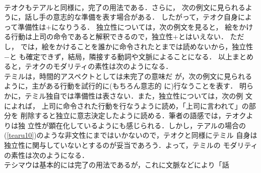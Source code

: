 \\テオクもテアルと同様に，完了の用法である．さらに，
次の例文に見られるように，話し手の意志的な準備を表す場合がある．
したがって，\hspace*{-0.2mm}テ\hspace*{-0.2mm}オ\hspace*{-0.2mm}ク自身によって準備性は$+$になりうる．
\hspace*{-0.2mm}独立性については，\hspace*{-0.2mm}次の例文を見ると，
絵をかける行動は上司の命令であると解釈できるので，独立性$+$とはいえない．
ただし，
では，\hspace*{-0.2mm}絵をか\hspace*{-0.2mm}け\hspace*{-0.2mm}る\hspace*{-0.2mm}こ\hspace*{-0.2mm}と\hspace*{-0.2mm}を誰かに命令されたとまでは読めないから，\hspace*{-0.2mm}独立性$-$と
も確定できず，結局，隣接する動詞や文脈によることになる．
以上まとめると，テオクのモダリティの素性は次のようになる．
\\テミルは，時間的アスペクトとしては未完了の意味だ
が，次の例文に見られるように，{\dg 主}がある行動を試行的に(もちろん意志的
に)行なうことを表す．
明らかに，テミル独自では準備性は表さない．また，独立性については，次の例
文によれば，
上司に命令された行動を行なうように読め，「上司に言われて」の部分を
削除すると独立に意志決定したように読める．筆者の語感では，テオクよりは独
立性が顕在化しているようにも感じられる．しかし，テアルの場合の
(\ref{tearu10})のような非文性にまではいかないので，テオクと同様にテミル
自身は独立性に関与していないとするのが妥当であろう．よって，テミルの
モダリティの素性は次のようになる．
\\
テシマウは基本的には完了の用法であるが，これに文脈などにより「話
